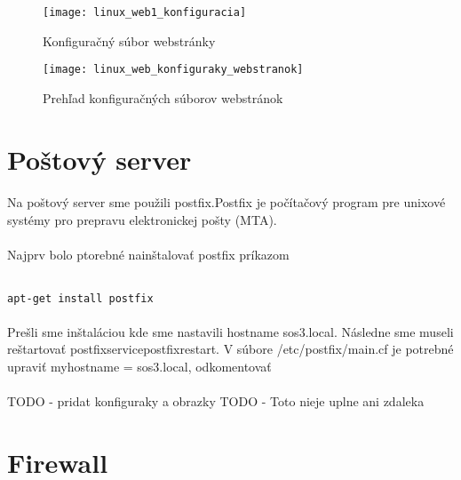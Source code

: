 \begin{figure}[!htb]
\centering
\texttt{[image: linux\_web1\_konfiguracia]}
\caption{Konfiguračný súbor webstránky}
\label{fig:web1_config_file}
\end{figure}

\begin{figure}[!htb]
\centering
\texttt{[image: linux\_web\_konfiguraky\_webstranok]}
\caption{Prehľad konfiguračných súborov webstránok}
\label{fig:web_config_files_list}
\end{figure}

\section{Poštový server}
\paragraph{}
Na poštový server sme použili postfix.Postfix je počítačový program pre unixové systémy pro prepravu elektronickej pošty (MTA).
\paragraph{}
Najprv bolo ptorebné nainštalovať postfix príkazom

\noindent
{\selectfont
\begin{small}
\begin{verbatim}

apt-get install postfix

\end{verbatim}
\end{small}
}

\paragraph{}
Prešli sme inštaláciou kde sme nastavili hostname sos3.local. Následne sme museli reštar\-tovať postfixservicepostfixrestart. V súbore /etc/postfix/main.cf je potrebné upraviť myhostname = sos3.local, odkomentovať\\
\paragraph{}
TODO - pridat konfiguraky a obrazky
TODO - Toto nieje uplne ani zdaleka

\section{Firewall}

